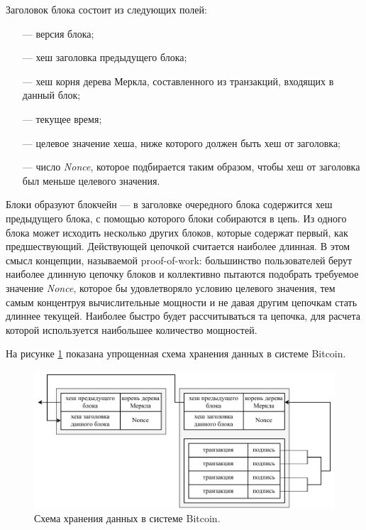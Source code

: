Заголовок блока состоит из следующих полей:
\begin{itemize}
	\item[---] версия блока;
	\item[---] хеш заголовка предыдущего блока;
	\item[---] хеш корня дерева Меркла, составленного из транзакций, входящих в данный блок;
	\item[---] текущее время;
	\item[---] целевое значение хеша, ниже которого должен быть хеш от заголовка;
	\item[---] число \textit{Nonce}, которое подбирается таким образом, чтобы хеш от заголовка был меньше целевого значения.
\end{itemize}

Блоки образуют блокчейн --- в заголовке очередного блока содержится хеш предыдущего блока, с помощью которого блоки собираются в цепь. Из одного блока может исходить несколько других блоков, которые содержат первый, как предшествующий. Действующей цепочкой считается наиболее длинная. В этом смысл концепции, называемой proof-of-work: большинство пользователей берут наиболее длинную цепочку блоков и коллективно пытаются подобрать требуемое значение \textit{Nonce}, которое бы удовлетворяло условию целевого значения, тем самым концентруя вычислительные мощности и не давая другим цепочкам стать длиннее текущей. Наиболее быстро будет рассчитываться та цепочка, для расчета которой используется наибольшее количество мощностей.

На рисунке \ref{fig:bitcoin} показана упрощенная схема хранения данных в системе Bitcoin.

\begin{figure}[hbtp]
	\centering
	\includegraphics[width=\textwidth]{./img/bitcoin.pdf}
	\caption{Схема хранения данных в системе Bitcoin.}
	\label{fig:bitcoin}
\end{figure}


